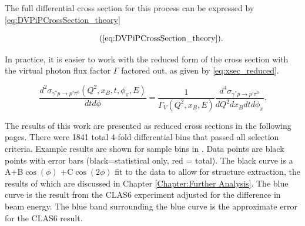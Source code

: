 The full differential cross section for this process can be expressed by \eqref{eq:DVPiPCrossSection_theory}

        \begin{equation*}
          \recallLabel{eq:DVPiPCrossSection_theory}.
        \end{equation*}

In practice, it is easier to work with the reduced form of the cross section with the virtual photon flux factor $\Gamma$ factored out, as given by \eqref{eq:xsec_reduced}.

 \begin{equation}\label{eq:xsec_reduced}
    \frac{d^2\sigma_{\gamma^*p \rightarrow p'\pi^0}(Q^2,x_B,t,\phi_{\pi},E)}{dtd\phi} = \frac{1}{\Gamma_V(Q^2,x_B,E)} \frac{d^4\sigma_{\gamma^*p \rightarrow p'\pi^0}}{dQ^2dx_Bdtd\phi_{\pi}}.
\end{equation}

The results of this work are presented as reduced cross sections in the following pages. There were 1841 total 4-fold differential bins that passed all selection criteria. Example results are shown for sample bins in . Data points are black points with error bars (black=statistical only, red = total). The black curve is a A+B$\cos(\phi)$ +C$\cos(2\phi)$ fit to the data to allow for structure extraction, the results of which are discussed in Chapter \ref{Chapter:Further Analysis}. The blue curve is the result from the CLAS6 experiment \parencite{Bedlinskiy2014ExclusiveCLAS} adjusted for the difference in beam energy. The blue band surrounding the blue curve is the approximate error for the CLAS6 result.

